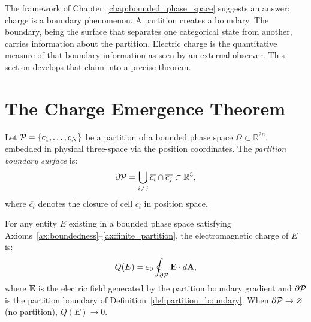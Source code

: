The framework of Chapter~\ref{chap:bounded_phase_space} suggests an answer:
charge is a boundary phenomenon. A partition creates a boundary. The boundary,
being the surface that separates one categorical state from another, carries
information about the partition. Electric charge is the quantitative measure
of that boundary information as seen by an external observer. This section
develops that claim into a precise theorem.

\section{The Charge Emergence Theorem}
\label{sec:charge_theorem}

\begin{definition}
\label{def:partition_boundary}
Let $\mathcal{P} = \{c_1, \ldots, c_N\}$ be a partition of a bounded phase space
$\Omega \subset \mathbb{R}^{2n}$, embedded in physical three-space via the
position coordinates. The \emph{partition boundary surface} is:
\begin{equation}
  \partial\mathcal{P} = \bigcup_{i \neq j} \overline{c_i} \cap \overline{c_j} \subset \mathbb{R}^3,
\end{equation}
where $\overline{c_i}$ denotes the closure of cell $c_i$ in position space.
\end{definition}

\begin{theorem}
\label{thm:charge_emergence}
For any entity $E$ existing in a bounded phase space satisfying
Axioms~\ref{ax:boundedness}--\ref{ax:finite_partition}, the electromagnetic
charge of $E$ is:
\begin{equation}
  Q(E) = \varepsilon_0 \oint_{\partial\mathcal{P}} \mathbf{E} \cdot d\mathbf{A},
  \label{eq:charge_gauss}
\end{equation}
where $\mathbf{E}$ is the electric field generated by the partition boundary
gradient and $\partial\mathcal{P}$ is the partition boundary of Definition~\ref{def:partition_boundary}.
When $\partial\mathcal{P} \to \varnothing$ (no partition), $Q(E) \to 0$.
\end{theorem}

